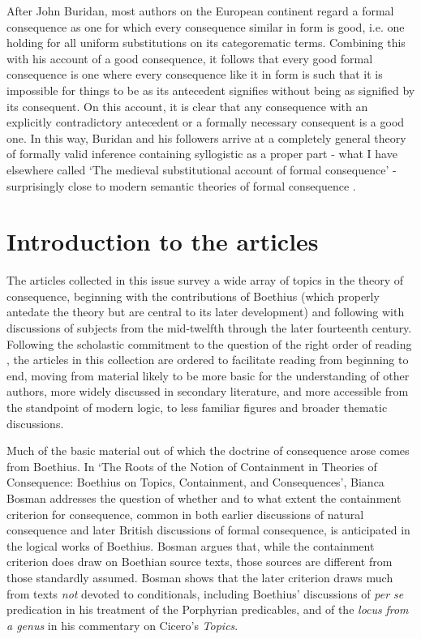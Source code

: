 \documentclass[]{article}
\begin{document}
After John Buridan, most authors on the European continent regard a formal consequence as one for which every consequence similar in form is good, i.e. one holding for all uniform substitutions on its categorematic terms. Combining this with his account of a good consequence, it follows that every good formal consequence is one where every consequence like it in form is such that it is impossible for things to be as its antecedent signifies without being as signified by its consequent. On this account, it is clear that any consequence with an explicitly contradictory antecedent or a formally necessary consequent is a good one. In this way, Buridan and his followers arrive at a completely general theory of formally valid inference containing syllogistic as a proper part - what I have elsewhere called `The medieval substitutional account of formal consequence' - surprisingly close to modern semantic theories of formal consequence \autocite{Archambault2018}.


\section{Introduction to the articles}
The articles collected in this issue survey a wide array of topics in the theory of consequence, beginning with the contributions of Boethius (which properly antedate the theory but are central to its later development) and following with discussions of subjects from the mid-twelfth through the later fourteenth century. Following the scholastic commitment to the question of the right order of reading \autocite[104]{Ebbesen}, the articles in this collection are ordered to facilitate reading from beginning to end, moving from material likely to be more basic for the understanding of other authors, more widely discussed in secondary literature, and more accessible from the standpoint of modern logic, to less familiar figures and broader thematic discussions.



Much of the basic material out of which the doctrine of consequence arose comes from Boethius. In `The Roots of the Notion of Containment in Theories of Consequence: Boethius on Topics, Containment, and Consequences', Bianca Bosman addresses the question of whether and to what extent the containment criterion for consequence, common in both earlier discussions of natural consequence and later British discussions of formal consequence, is anticipated in the logical works of Boethius. Bosman argues that, while the containment criterion does draw on Boethian source texts, those sources are different from those standardly assumed. Bosman shows that the later criterion draws much from texts \textit{not} devoted to conditionals, including Boethius' discussions of \textit{per se} predication in his treatment of the Porphyrian predicables, and of the \textit{locus} \textit{from a genus} in his commentary on Cicero's \textit{Topics}.
\end{document}

